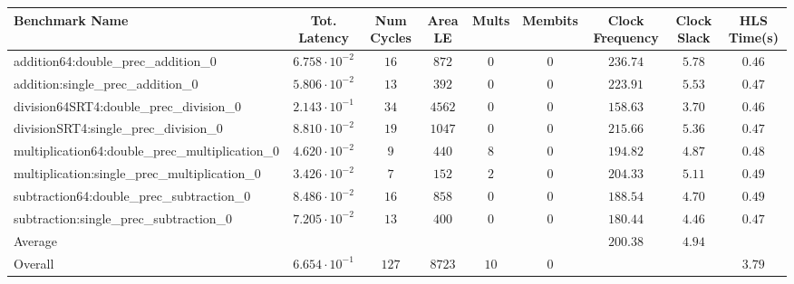 \begin{tabular}{|l|c|c|c|c|c|c|c|c|}
\hline
Benchmark Name                                   & Tot. Latency            & Num Cycles & Area LE  & Mults  & Membits & Clock Frequency & Clock Slack & HLS Time(s) \\
\hline
addition64:double\_prec\_addition\_0             & $ 6.758 \cdot 10^{-2} $ & $ 16     $ & $ 872  $ & $ 0  $ & $ 0   $ & $ 236.74      $ & $ 5.78    $ & $ 0.46    $ \\
addition:single\_prec\_addition\_0               & $ 5.806 \cdot 10^{-2} $ & $ 13     $ & $ 392  $ & $ 0  $ & $ 0   $ & $ 223.91      $ & $ 5.53    $ & $ 0.47    $ \\
division64SRT4:double\_prec\_division\_0         & $ 2.143 \cdot 10^{-1} $ & $ 34     $ & $ 4562 $ & $ 0  $ & $ 0   $ & $ 158.63      $ & $ 3.70    $ & $ 0.46    $ \\
divisionSRT4:single\_prec\_division\_0           & $ 8.810 \cdot 10^{-2} $ & $ 19     $ & $ 1047 $ & $ 0  $ & $ 0   $ & $ 215.66      $ & $ 5.36    $ & $ 0.47    $ \\
multiplication64:double\_prec\_multiplication\_0 & $ 4.620 \cdot 10^{-2} $ & $ 9      $ & $ 440  $ & $ 8  $ & $ 0   $ & $ 194.82      $ & $ 4.87    $ & $ 0.48    $ \\
multiplication:single\_prec\_multiplication\_0   & $ 3.426 \cdot 10^{-2} $ & $ 7      $ & $ 152  $ & $ 2  $ & $ 0   $ & $ 204.33      $ & $ 5.11    $ & $ 0.49    $ \\
subtraction64:double\_prec\_subtraction\_0       & $ 8.486 \cdot 10^{-2} $ & $ 16     $ & $ 858  $ & $ 0  $ & $ 0   $ & $ 188.54      $ & $ 4.70    $ & $ 0.49    $ \\
subtraction:single\_prec\_subtraction\_0         & $ 7.205 \cdot 10^{-2} $ & $ 13     $ & $ 400  $ & $ 0  $ & $ 0   $ & $ 180.44      $ & $ 4.46    $ & $ 0.47    $ \\
\hline
Average                                          & $                     $ & $        $ & $      $ & $    $ & $     $ & $ 200.38      $ & $ 4.94    $ & $         $ \\
\hline
Overall                                          & $ 6.654 \cdot 10^{-1} $ & $ 127    $ & $ 8723 $ & $ 10 $ & $ 0   $ & $             $ & $         $ & $ 3.79    $ \\
\hline
\end{tabular}

